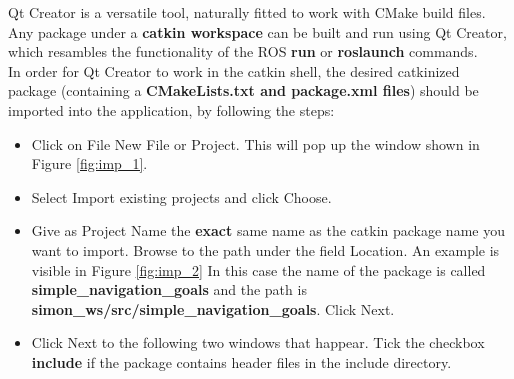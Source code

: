 \documentclass[11pt,a4paper]{article}
\begin{document}
Qt Creator is a versatile tool, naturally fitted to work with CMake build files. Any package under a \textbf{catkin workspace} can be built and run using Qt Creator, which resambles the functionality of the ROS \textbf{run} or \textbf{roslaunch} commands. \\
In order for Qt Creator to work in the catkin shell, the desired catkinized package (containing a \textbf{CMakeLists.txt and package.xml files}) should be imported into the application, by following the steps:
\begin{itemize}
\item Click on File \textrightarrow New File or Project. This will pop up the window shown in Figure \ref{fig:imp_1}.
\item Select Import existing projects and click Choose.
\item Give as Project Name the \textbf{exact} same name as the catkin package name you want to import. Browse to the path under the field Location. An example is visible in Figure \ref{fig:imp_2} In this case the name of the package is called \textbf{simple{\_}navigation{\_}goals} and the path is \textbf{simon{\_}ws/src/simple{\_}navigation{\_}goals}. Click Next.
\item Click Next to the following two windows that happear. Tick the checkbox \textbf{include} if the package contains header files in the include directory. 
\end{itemize}
\end{document}
